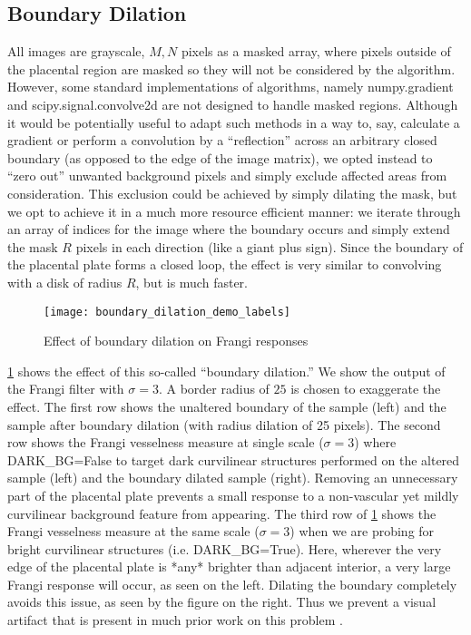     \subsection{Boundary Dilation} \label{sec:boundary-dilation}
    
    All images are grayscale, $M,N$ pixels as a masked array, where pixels outside of the placental region are masked so they will not be considered by the algorithm. However, some standard
    implementations of algorithms, namely \textrm{numpy.gradient and scipy.signal.convolve2d} are not designed to handle masked regions. Although it would be potentially useful to adapt such methods in a way to, say, calculate a gradient or perform a convolution by a ``reflection'' across an arbitrary closed boundary (as opposed to the edge of the image matrix), we opted instead to ``zero out'' unwanted background pixels and simply exclude affected areas from consideration. This exclusion could be achieved by
    simply dilating the mask, but we opt to achieve it in a much more resource efficient manner: we iterate through an array of indices for the image where the boundary occurs and simply extend the mask $R$ pixels in each direction (like a giant plus sign). Since the boundary of the placental plate forms a closed loop, the effect is very similar to convolving with a disk of radius $R$, but is much faster.
    
    \begin{figure} 
        \texttt{[image: boundary\_dilation\_demo\_labels]}
        \caption{Effect of boundary dilation on Frangi responses}
        \label{fig:boundary-demo}
    \end{figure}
    
    \cref{fig:boundary-demo} shows the effect of this so-called ``boundary dilation.'' 
    We show the output of the Frangi filter with $\sigma=3$. A border radius of $25$ is chosen to exaggerate the effect.
    The first row shows the unaltered boundary of the sample (left) and
        the sample after boundary dilation (with radius dilation of 25 pixels).
    The second row shows the Frangi vesselness measure at single scale ($\sigma=3$) where \textrm{DARK\_BG=False} to target dark curvilinear structures performed on the altered sample (left) and the boundary dilated sample (right). Removing an unnecessary part of
    the placental plate prevents a small response to a non-vascular yet mildly curvilinear
    background feature from appearing.
    The third row of \cref{fig:boundary-demo} shows the Frangi vesselness measure at the same scale ($\sigma=3$) when we are probing for bright curvilinear structures (i.e.
    \textrm{DARK\_BG=True}). Here, wherever the very edge of the placental plate is *any* brighter than adjacent interior, a very large Frangi response will occur, as seen on the left. Dilating the boundary completely avoids this issue, as seen by the figure on the right. Thus we prevent a visual artifact that is present in much prior work on this problem \autocite{huynh2013filter,almoussa-ucla-reu}.

